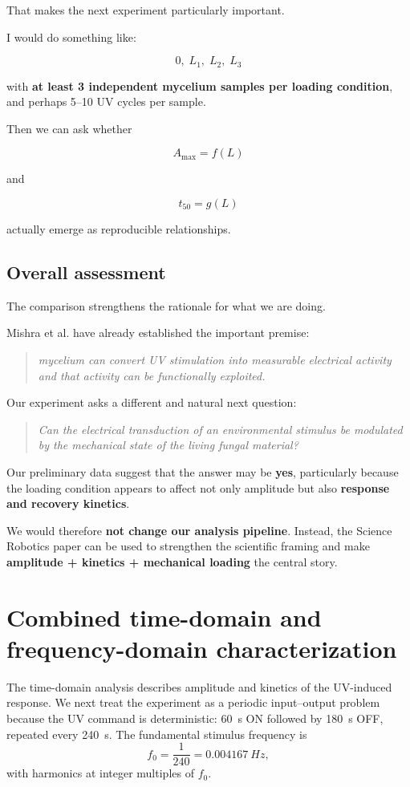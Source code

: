 \documentclass[11pt,a4paper]{article}
\begin{document}
That makes the next experiment particularly important.

I would do something like:

\[
0,\;L_1,\;L_2,\;L_3
\]

with \textbf{at least 3 independent mycelium samples per loading condition},
and perhaps 5--10 UV cycles per sample.

Then we can ask whether

\[
A_{\max}=f(L)
\]

and

\[
t_{50}=g(L)
\]

actually emerge as reproducible relationships.

\subsection{Overall assessment}

The comparison strengthens the rationale for what we are doing.

Mishra et al. have already established the important premise:

\begin{quote}
\emph{mycelium can convert UV stimulation into measurable electrical activity
and that activity can be functionally exploited.}
\end{quote}

Our experiment asks a different and natural next question:

\begin{quote}
\emph{Can the electrical transduction of an environmental stimulus be
modulated by the mechanical state of the living fungal material?}
\end{quote}

Our preliminary data suggest that the answer may be \textbf{yes}, particularly
because the loading condition appears to affect not only amplitude but also
\textbf{response and recovery kinetics}.

We would therefore \textbf{not change our analysis pipeline}. Instead, the
Science Robotics paper can be used to strengthen the scientific framing and
make \textbf{amplitude + kinetics + mechanical loading} the central story.

\section{Combined time-domain and frequency-domain characterization}

The time-domain analysis describes amplitude and kinetics of the UV-induced response. We next treat the experiment as a periodic input--output problem because the UV command is deterministic: \SI{60}{s} ON followed by \SI{180}{s} OFF, repeated every \SI{240}{s}. The fundamental stimulus frequency is
\[
f_0=\frac{1}{240}=\SI{0.004167}{Hz},
\]
with harmonics at integer multiples of $f_0$.
\end{document}
